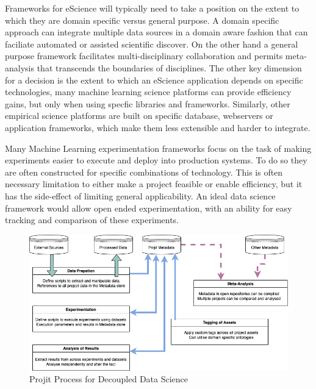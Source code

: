 \documentclass[sigconf]{acmart}
\begin{document}
Frameworks for eScience will typically need to take a position on the extent to which 
they are domain specific versus general purpose. A domain specific approach can 
integrate multiple data sources in a domain aware fashion that can faciliate 
automated or assisted scientific discover\cite{Howe2008}. On the
other hand a general purpose framework facilitates multi-disciplinary collaboration 
and permits meta-analysis that transcends the boundaries of disciplines. 
The other key dimension for a decision is the extent to which an eScience 
application depends on specific technologies, many machine learning science platforms
can provide efficiency gains, but only when using specfic libraries and 
frameworks\cite{Alberti:2018,MolnerDomenech:2020}. Similarly, other empirical 
science platforms are built on specific database, webservers or application
frameworks, which make them less extensible and harder to integrate.

Many Machine Learning experimentation frameworks focus on the task of making experiments
easier to execute and deploy into production systems\cite{Alberti:2018,MolnerDomenech:2020}.
To do so they are often constructed for specific combinations of technology.
This is often necessary limitation to either make a project feasible or enable efficiency,
but it has the side-effect of limiting general applicability. An ideal data science
framework would allow open ended experimentation, with an ability for easy tracking
and comparison of these experiments.

\begin{figure}
\includegraphics[scale=0.6]{./Projit_decoupled_process.drawio.png}
\caption{Projit Process for Decoupled Data Science}
\label{fig:projit}
\end{figure}
\end{document}
